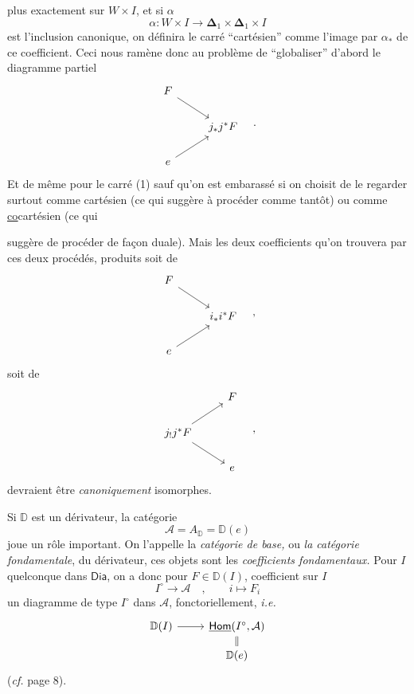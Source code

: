 \documentclass[11pt]{article}
\newcommand{\printedpage}[1]{\marginpar{\footnotesize p.~#1}}
\newcommand{\msp}[1]{\marginpar{\footnotesize [#1]}}
\newcommand{\uHom}{\underline{\mathsf{Hom}}}
\newcommand{\Dia}{\mathsf{Dia}}
\newcommand{\DD}{\mathbb{D}}
\newcommand{\Del}{\mathbf{\Delta}}
\begin{document}
\msp{page 10}

plus exactement sur $W \times I$, et si $\alpha$
\[ \alpha : W \times I \longrightarrow \Del_1 \times \Del_1 \times I \]
est l'inclusion canonique, on définira le carré “cartésien” comme l'image par $\alpha_*$ de ce coefficient. Ceci nous ramène donc au problème de “globaliser” d'abord le diagramme partiel
\[
\begin{tikzcd}
F \arrow[dr] & \\
& j_*j^*F \\
e \arrow[ur] &
\end{tikzcd}
\quad .
\]
Et de même pour le carré (1) sauf qu'on est embarassé si on choisit de le regarder surtout comme cartésien (ce qui suggère à procéder comme tantôt) ou comme \underline{co}cartésien (ce qui %

\printedpage{9}
\noindent suggère de procéder de façon duale). Mais les deux coefficients qu’on trouvera par ces deux procédés, produits soit de
\[
\begin{tikzcd}
F \arrow[dr] & \\
 & i_*i^*F \\
e \arrow[ur] &
\end{tikzcd}
\quad ,
\]
soit de
\[
\begin{tikzcd}
 & F \\
j_!j^*F \arrow[ur] \arrow[dr] & \\
 & e
\end{tikzcd}
\quad ,
\]
devraient être \textit{canoniquement} isomorphes.

\noindent\msp{page 11}Si $\DD$ est un dérivateur, la catégorie
\[
\mathcal{A} = A_{\DD} = \DD(e) %
\]
joue un rôle important. On l’appelle la \textit{catégorie de base,} ou \textit{la catégorie fondamentale}, du dérivateur, ces objets sont les \textit{coefficients fondamentaux.} Pour $I$ quelconque dans $\Dia$, on a donc pour $F \in \DD(I)$, coefficient sur $I$ %
\[
I^\circ \longrightarrow \mathcal{A} \quad , \qquad i \longmapsto F_i
\]
un diagramme de type $I^\circ$ dans $\mathcal{A}$, fonctoriellement, \textit{i.e.}
\[
\begin{tikzcd}[row sep=small]
\DD(I) \arrow[r] & \uHom(I^\circ,\mathcal{A}) \arrow[d, equal] \\
 & \DD(e)
\end{tikzcd}
\]
(\textit{cf.} page 8).
\end{document}
